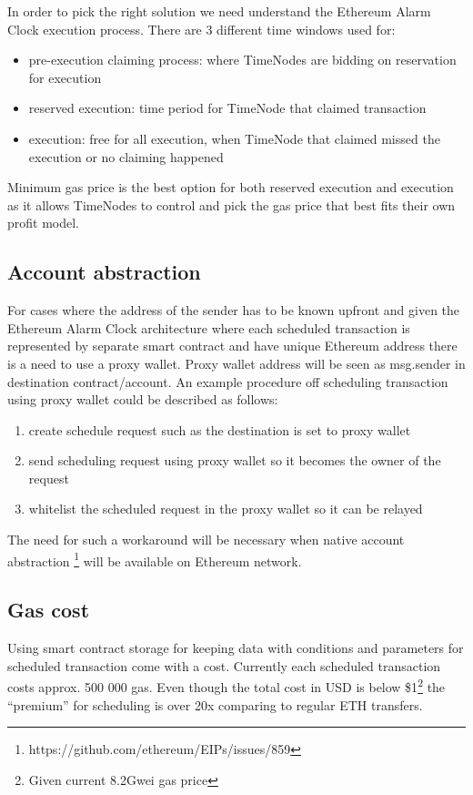 \documentclass{report}
\begin{document}
  In order to pick the right solution we need understand the Ethereum Alarm Clock execution process. There are 3 different time windows used for:
  \begin{itemize}
    \item pre-execution claiming process: where TimeNodes are bidding on reservation for execution
    \item reserved execution: time period for TimeNode that claimed transaction
    \item execution: free for all execution, when TimeNode that claimed missed the execution or no claiming happened
  \end{itemize}
  Minimum gas price is the best option for both reserved execution and execution as it allows TimeNodes to control and pick the gas price that best fits their own profit model.

  \subsection{Account abstraction}
  For cases where the address of the sender has to be known upfront and given the Ethereum Alarm Clock architecture where each scheduled transaction is represented by separate smart contract and have unique Ethereum address there is a need to use a proxy wallet.
  Proxy wallet address will be seen as msg.sender in destination contract/account. An example procedure off scheduling transaction using proxy wallet could be described as follows:
  \begin{enumerate}
    \item create schedule request such as the destination is set to proxy wallet
    \item send scheduling request using proxy wallet so it becomes the owner of the request
    \item whitelist the scheduled request in the proxy wallet so it can be relayed
  \end{enumerate}

  The need for such a workaround will be necessary when native account abstraction \footnote{https://github.com/ethereum/EIPs/issues/859} will be available on Ethereum network.

  \subsection{Gas cost}
  Using smart contract storage for keeping data with conditions and parameters for scheduled transaction come with a cost. Currently each scheduled transaction costs approx. 500 000 gas. Even though the total cost in USD is below \$1\footnote{Given current 8.2Gwei gas price} the “premium” for scheduling is over 20x comparing to regular ETH transfers.
\end{document}
